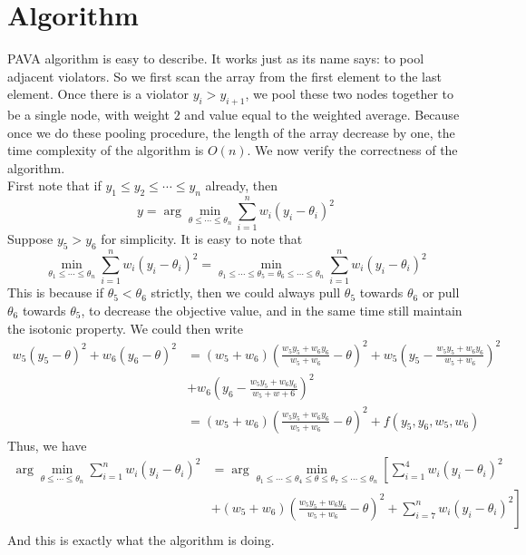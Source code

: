 \documentclass[12pt]{article}
\newcommand{\bra}[1]{\left(#1\right)}
\def\bal{\begin{aligned}}
\def\eal{\end{aligned}}
\begin{document}
\section{Algorithm}
PAVA algorithm is easy to describe. It works just as its name says: to pool adjacent violators. So we first scan the array from the first element to the last element. Once there is a violator $y_i>y_{i+1}$, we pool these two nodes together to be a single node, with weight $2$ and value equal to the weighted average. Because once we do these pooling procedure, the length of the array decrease by one, the time complexity of the algorithm is $O(n)$. We now verify the correctness of the algorithm. \\
First note that if $y_1\leq y_2\leq\cdots\leq y_n$ already, then
\[
y=\arg\min_{\theta\leq\cdots\leq \theta_n}\sum_{i=1}^n w_i\bra{y_i-\theta_i}^2
\]
Suppose $y_5>y_6$ for simplicity. It is easy to note that
\[
\min_{\theta_1\leq\cdots\leq\theta_n}\sum_{i=1}^n w_i\bra{y_i-\theta_i}^2=\min_{\theta_1\leq\cdots\leq \theta_5=\theta_6\leq\cdots\leq\theta_n}\sum_{i=1}^n w_i\bra{y_i-\theta_i}^2
\]
This is because if $\theta_5<\theta_6$ strictly, then we could always pull $\theta_5$ towards $\theta_6$ or pull $\theta_6$ towards $\theta_5$, to decrease the objective value, and in the same time still maintain the isotonic property. We could then write
\[\bal
w_5\bra{y_5-\theta}^2+w_6\bra{y_6-\theta}^2&=\bra{w_5+w_6}\bra{\frac{w_5y_5+w_6y_6}{w_5+w_6}-\theta}^2+w_5\bra{y_5-\frac{w_5y_5+w_6y_6}{w_5+w_6}}^2\\&+w_6\bra{y_6-\frac{w_5y_5+w_6y_6}{w_5+w+6}}^2
\\&=\bra{w_5+w_6}\bra{\frac{w_5y_5+w_6y_6}{w_5+w_6}-\theta}^2+f(y_5,y_6,w_5,w_6)
\eal\]
Thus, we have
\[\bal
\arg\min_{\theta\leq\cdots\leq \theta_n}\sum_{i=1}^n w_i\bra{y_i-\theta_i}^2&=\arg\min_{\theta_1\leq\cdots\leq \theta_4\leq\theta\leq\theta_7\leq\cdots\leq \theta_n} \left[\sum_{i=1}^4w_i\bra{y_i-\theta_i}^2\right.\\&+ \left.\bra{w_5+w_6}\bra{\frac{w_5y_5+w_6y_6}{w_5+w_6}-\theta}^2 +\sum_{i=7}^n w_i\bra{y_i-\theta_i}^2 \right]
\eal\]
And this is exactly what the algorithm is doing.
\end{document}
